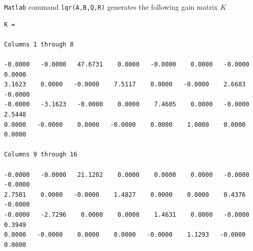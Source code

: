 \texttt{Matlab} command \texttt{lqr(A,B,Q,R)} generates the following gain matrix $ K $
\begin{lstlisting}
K =

Columns 1 through 8

-0.0000   -0.0000   47.6731    0.0000   -0.0000    0.0000   -0.0000    0.0000
3.1623    0.0000   -0.0000    7.5117    0.0000   -0.0000    2.6683   -0.0000
-0.0000   -3.1623   -0.0000    0.0000    7.4605    0.0000   -0.0000    2.5448
0.0000   -0.0000    0.0000   -0.0000    0.0000    1.0000    0.0000    0.0000

Columns 9 through 16

-0.0000   -0.0000   21.1202    0.0000    0.0000    0.0000   -0.0000   -0.0000
2.7501    0.0000   -0.0000    1.4827    0.0000    0.0000    0.4376   -0.0000
-0.0000   -2.7296    0.0000    0.0000    1.4631    0.0000   -0.0000    0.3949
0.0000   -0.0000    0.0000    0.0000   -0.0000    1.1293   -0.0000    0.0000
\end{lstlisting}




